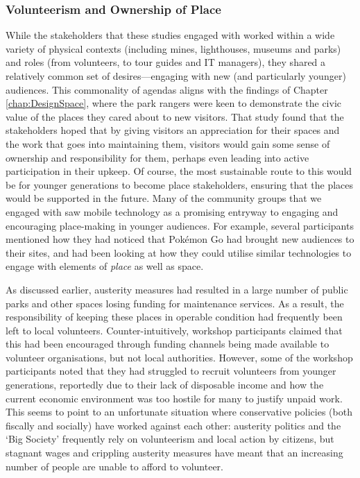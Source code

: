 \subsubsection{Volunteerism and Ownership of Place}

While the stakeholders that these studies engaged with worked within a wide variety of physical contexts (including mines, lighthouses, museums and parks) and roles (from volunteers, to tour guides and IT managers), they shared a relatively common set of desires---engaging with new (and particularly younger) audiences. This commonality of agendas aligns with the findings of Chapter \ref{chap:DesignSpace}, where the park rangers were keen to demonstrate the civic value of the places they cared about to new visitors. That study found that the stakeholders hoped that by giving visitors an appreciation for their spaces and the work that goes into maintaining them, visitors would gain some sense of ownership and responsibility for them, perhaps even leading into active participation in their upkeep. Of course, the most sustainable route to this would be for younger generations to become place stakeholders, ensuring that the places would be supported in the future. Many of the community groups that we engaged with saw mobile technology as a promising entryway to engaging and encouraging place-making in younger audiences. For example, several participants mentioned how they had noticed that Pok\'emon Go had brought new audiences to their sites, and had been looking at how they could utilise similar technologies to engage with elements of \textit{place} as well as space.

As discussed earlier, austerity measures had resulted in a large number of public parks and other spaces losing funding for maintenance services. As a result, the responsibility of keeping these places in operable condition had frequently been left to local volunteers. Counter-intuitively, workshop participants claimed that this had been encouraged through funding channels being made available to volunteer organisations, but not local authorities. However, some of the workshop participants noted that they had struggled to recruit volunteers from younger generations, reportedly due to their lack of disposable income and how the current economic environment was too hostile for many to justify unpaid work. This seems to point to an unfortunate situation where conservative policies (both fiscally and socially) have worked against each other: austerity politics and the `Big Society' frequently rely on volunteerism and local action by citizens, but stagnant wages and crippling austerity measures have meant that an increasing number of people are unable to afford to volunteer.

